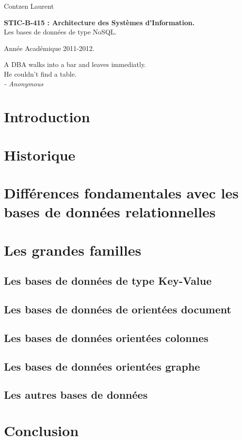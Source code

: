 \documentclass[11pt]{article}
\author{Contzen Laurent}
\begin{document}
\begin{titlepage}  
  \begin{flushleft}
    Contzen Laurent
  \end{flushleft}
  \begin{center}
    \vspace{85mm}\LARGE{\textbf{STIC-B-415 : Architecture des Systèmes d'Information.} \\    
      Les bases de données de type NoSQL.}
  \end{center}
  \begin{flushright}
    \vspace{95mm}
    Année Académique 2011-2012.             
  \end{flushright}
\end{titlepage}

\tableofcontents
\newpage
\vspace*{\fill}
\begin{flushright}
  A DBA walks into a bar and leaves immediatly. \\
  He couldn't find a table. \\
  \textit{- Anonymous}
\end{flushright}
\vspace*{\fill}
\newpage

\section{Introduction}

\section{Historique}

\section{Différences fondamentales avec les bases de données relationnelles}

\section{Les grandes familles}
\subsection{Les bases de données de type Key-Value}

\subsection{Les bases de données de orientées document}

\subsection{Les bases de données orientées colonnes}

\subsection{Les bases de données orientées graphe}

\subsection{Les autres bases de données}

\section{Conclusion}
\end{document}

